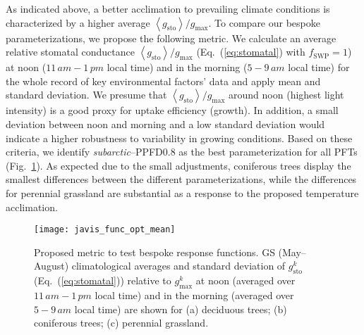 \documentclass[bg, manuscript]{copernicus}
\begin{document}
As indicated above, a better acclimation to prevailing climate conditions is characterized by a higher average $\left<g_\mathrm{sto}\right>/g_\mathrm{max}$. To compare our bespoke parameterizations, we propose the following metric. We calculate an average relative stomatal conductance $\left<g_\mathrm{sto}\right>/g_\mathrm{max}$ (Eq.~(\ref{eq:stomatal}) with $f_\mathrm{SWP}=1$) at noon ($11\,\unit{am}-1\,\unit{pm}$ local time) and in the morning ($5-9\,\unit{am}$ local time) for the whole record of key environmental factors' data and apply mean and standard deviation. We presume that $\left<g_\mathrm{sto}\right>/g_\mathrm{max}$ around noon (highest light intensity) is a good proxy for  uptake efficiency (growth). In addition, a small deviation between noon and morning and a low standard deviation would indicate a higher robustness to variability in growing conditions. Based on these criteria, we identify \emph{subarctic}--PPFD0.8 as the best parameterization for all PFTs (Fig.~\ref{fig:javis_func_opt_mean}). As expected due to the small adjustments, coniferous trees display the smallest differences between the different parameterizations, while the differences for perennial grassland are substantial as a response to the proposed temperature acclimation.

\begin{figure}[t]
  \texttt{[image: javis\_func\_opt\_mean]}
  \caption{Proposed metric to test bespoke response functions. GS (May--August) climatological averages and standard deviation of $g_\mathrm{sto}^k$ (Eq.~(\ref{eq:stomatal})) relative to $g_\mathrm{max}^k$ at noon (averaged over $11\,\unit{am}-1\,\unit{pm}$ local time) and in the morning (averaged over $5-9\,\unit{am}$ local time) are shown for (a) deciduous trees; (b) coniferous trees; (c) perennial grassland. }
  \label{fig:javis_func_opt_mean}
\end{figure}
\end{document}
